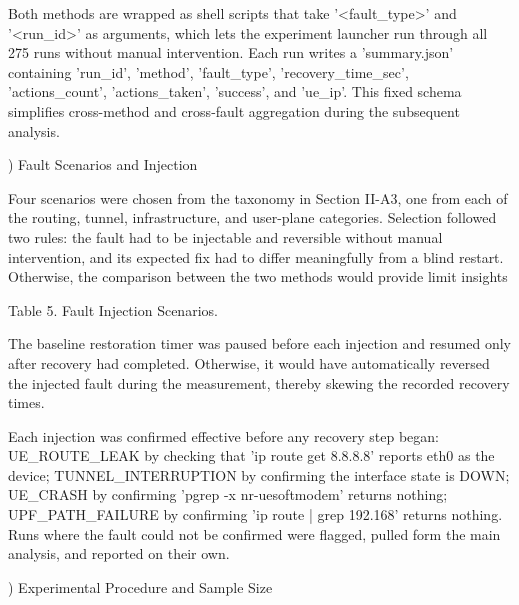\documentclass[conference]{IEEEtran}
\begin{document}
Both methods are wrapped as shell scripts that take '<fault\_type>' and '<run\_id>' as arguments, which lets the experiment launcher run through all 275 runs without manual intervention. Each run writes a 'summary.json' containing 'run\_id', 'method', 'fault\_type', 'recovery\_time\_sec', 'actions\_count', 'actions\_taken', 'success', and 'ue\_ip'. This fixed schema simplifies cross-method and cross-fault aggregation during the subsequent analysis.

) Fault Scenarios and Injection

Four scenarios were chosen from the taxonomy in Section II-A3, one from each of the routing, tunnel, infrastructure, and user-plane categories. Selection followed two rules: the fault had to be injectable and reversible without manual intervention, and its expected fix had to differ meaningfully from a blind restart. Otherwise, the comparison between the two methods would provide limit insights

Table 5. Fault Injection Scenarios.

The baseline restoration timer was paused before each injection and resumed only after recovery had completed. Otherwise, it would have automatically reversed the injected fault during the measurement, thereby skewing the recorded recovery times.

Each injection was confirmed effective before any recovery step began: UE\_ROUTE\_LEAK by checking that 'ip route get 8.8.8.8' reports eth0 as the device; TUNNEL\_INTERRUPTION by confirming the interface state is DOWN; UE\_CRASH by confirming 'pgrep -x nr-uesoftmodem' returns nothing; UPF\_PATH\_FAILURE by confirming 'ip route | grep 192.168' returns nothing. Runs where the fault could not be confirmed were flagged, pulled form the main analysis, and reported on their own.

) Experimental Procedure and Sample Size
\end{document}
